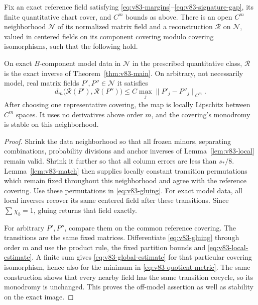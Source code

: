 \begin{theorem}
\label{thm:v83-global}
Fix an exact reference field satisfying
\eqref{eq:v83-margins}--\eqref{eq:v83-signature-gap}, its finite
quantitative chart cover, and $C^m$ bounds as above. There is an open
$C^m$ neighborhood $\mathcal N$ of its normalized matrix field and
a reconstruction $\mathcal R$ on $\mathcal N$, valued in centered
fields on its component covering modulo covering isomorphisms, such
that the following hold.

On exact $B$-component model data in $\mathcal N$ in the prescribed
quantitative class, $\mathcal R$ is the exact inverse of Theorem~\ref{thm:v83-main}. On arbitrary, not necessarily
model, real matrix fields $P',P''\in\mathcal N$ it satisfies
\begin{equation}\label{eq:v83-global-estimate}
 d_m\bigl(\mathcal R(P'),\mathcal R(P'')\bigr)
          \le C\max_j\|P'_j-P''_j\|_{C^m}.
\end{equation}
After choosing one representative covering, the map is locally
Lipschitz between $C^m$ spaces. It uses no derivatives above order
$m$, and the covering's monodromy is stable on this neighborhood.
\end{theorem}
\begin{proof}
Shrink the data neighborhood so that all frozen minors, separating
combinations, probability divisions and anchor inverses of
Lemma~\ref{lem:v83-local} remain valid. Shrink it further so that
all column errors are less than $s_*/8$. Lemma~\ref{lem:v83-match}
then supplies locally constant transition permutations which remain
fixed throughout this neighborhood and agree with the reference
covering. Use these permutations in \eqref{eq:v83-gluing}.
For exact model data, all local inverses recover its same centered
field after these transitions. Since $\sum\chi_b=1$, gluing returns
that field exactly.

For arbitrary $P',P''$, compare them on the common reference covering.
The transitions are the same fixed matrices. Differentiate
\eqref{eq:v83-gluing} through order $m$ and use the product rule,
the fixed partition bounds and \eqref{eq:v83-local-estimate}.
A finite sum gives \eqref{eq:v83-global-estimate} for that particular
covering isomorphism, hence also for the minimum in
\eqref{eq:v83-quotient-metric}. The same construction shows that
every nearby field has the same transition cocycle, so its monodromy
is unchanged. This proves the off-model assertion as well as stability
on the exact image.
\end{proof}

